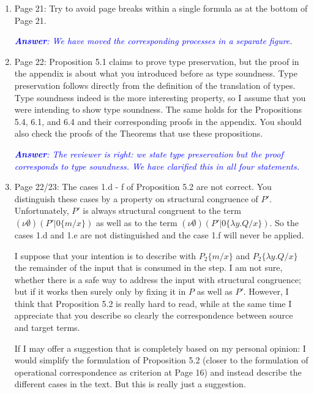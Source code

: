 \documentclass[11pt,a4paper]{article}
\newcommand{\answ}[1]{\smallskip \emph{\textcolor{blue}{\textbf{Answer}:  #1}}}
\newcommand{\checkthis}{}
\begin{document}
\begin{enumerate}
  \answ{Following our previous answer, we have revised the example to maintain consistency with the definition. because of the modification to the auxiliary mapping, we do not have wrong renamings for variables.} \checkthis
  
\item Page 21: Try to avoid page breaks within a single formula as at the bottom of
  Page 21.
  
  \answ{We have moved the corresponding processes in a separate figure.}
  
\item Page 22: Proposition 5.1 claims to prove type preservation, but the proof in
  the appendix is about what you introduced before as type soundness. Type
  preservation follows directly from the definition of the translation of types.
  Type soundness indeed is the more interesting property, so I assume that you
  were intending to show type soundness. The same holds for the Propositions
  5.4, 6.1, and 6.4 and their corresponding proofs in the appendix. You should
  also check the proofs of the Theorems that use these propositions.
  
  \answ{The reviewer is right: we state type preservation but the proof corresponds to type soundness. We have clarified this in all four statements.}
  
\item  Page 22/23: The cases 1.d - f of Proposition 5.2 are not correct. You
  distinguish these cases by a property on structural congruence of $P'$.
  Unfortunately, $P'$ is always structural congruent to the term
  $(\nu \emptyset) (P' | 0\{m/x\})$ as well as to the term
  $(\nu \emptyset) (P' | 0\{\lambda y. Q/x\})$. So the cases 1.d and 1.e are not
  distinguished and the case 1.f will never be applied. 
  
  I suppose that your
  intention is to describe with $P_2\{m/x\}$ and $P_2\{\lambda y. Q/x\}$ the remainder
  of the input that is consumed in the step. I am not sure, whether there is a
  safe way to address the input with structural congruence; but if it works then
  surely only by fixing it in $P$ as well as $P'$. However, I think that Proposition
  5.2 is really hard to read, while at the same time I appreciate that you
  describe so clearly the correspondence between source and target terms. 
  
  If I
  may offer a suggestion that is completely based on my personal opinion: I
  would simplify the formulation of Proposition 5.2 (closer to the formulation
  of operational correspondence as criterion at Page 16) and instead describe
  the different cases in the text. But this is really just a suggestion.
  

\end{enumerate}
\end{document}
